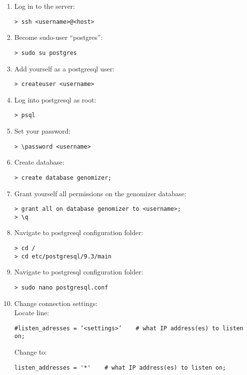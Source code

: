 \documentclass[a4paper]{report}
\begin{document}
    \begin{enumerate}
      \item Log in to the server:
      \begin{verbatim}
> ssh <username>@<host>
      \end{verbatim}

      \item Become sudo-user “postgres”:
      \begin{verbatim}
> sudo su postgres
      \end{verbatim}

      \item Add yourself as a postgresql user:
      \begin{verbatim}
> createuser <username>
      \end{verbatim}

      \item Log into postgresql as root:
      \begin{verbatim}
> psql
      \end{verbatim}

      \item Set your password:
      \begin{verbatim}
> \password <username>
      \end{verbatim}

      \item Create database:
      \begin{verbatim}
> create database genomizer;
      \end{verbatim}

      \item Grant yourself all permissions on the genomizer database: \begin{verbatim}
> grant all on database genomizer to <username>;
> \q
      \end{verbatim}

      \item Navigate to postgresql configuration folder:
      \begin{verbatim}
> cd /
> cd etc/postgresql/9.3/main
      \end{verbatim}

      \item Navigate to postgresql configuration folder:
      \begin{verbatim}
> sudo nano postgresql.conf
      \end{verbatim}

      \item Change connection settings:\\Locate line: 
      \begin{verbatim}
#listen_adresses = ‘<settings>’    # what IP address(es) to listen on;
      \end{verbatim}
      Change to:
      \begin{verbatim}
listen_addresses = '*'    # what IP address(es) to listen on;
      \end{verbatim}


\end{enumerate}
\end{document}
